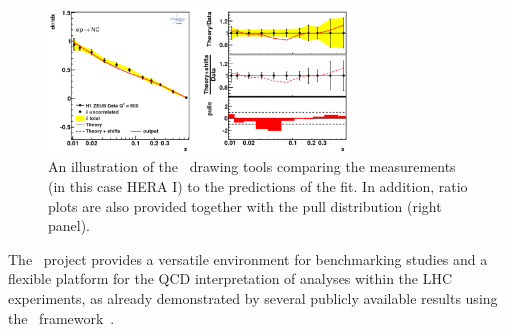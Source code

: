 \begin{description}
\begin{figure}[!ht]
   \centering
   \includegraphics[width=8cm]{datatheory.pdf}
   \caption{An illustration of the \fitter~drawing tools comparing the measurements (in this case HERA I) to the predictions of the fit. In addition, ratio plots are also provided together with the pull distribution (right panel).} 
 \label{fig:data}
\end{figure}

\end{description}
%


The \fitter~project provides a versatile environment for benchmarking studies 
and a flexible platform for the QCD interpretation of analyses within the LHC experiments,
as already demonstrated by several publicly available results using the \fitter\ framework~\cite{atlas:strange,atlas:jets,atlas:hm,cms:strange,cms:jets,h1:2012kk,h1zeus:charm}.  

